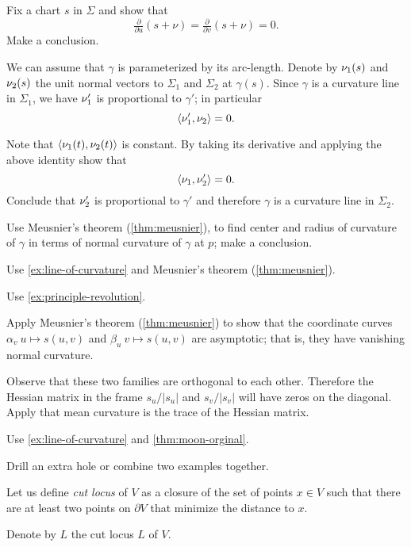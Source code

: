  Fix a chart $s$ in $\Sigma$ and show that 
\[\tfrac{\partial }{\partial u}(s+\nu)
=
\tfrac{\partial }{\partial v}(s+\nu)
=
0.\]
Make a conclusion.

We can assume that $\gamma$ is parameterized by its arc-length.
Denote by $\nu_1(s)$ and $\nu_2(s)$ the unit normal vectors to $\Sigma_1$ and $\Sigma_2$ at $\gamma(s)$.
Since $\gamma$ is a curvature line in $\Sigma_1$, we have 
$\nu_1'$ is proportional to $\gamma'$;
in particular 
\[\langle\nu_1',\nu_2\rangle=0.\]

Note that $\langle \nu_1(t),\nu_2(t)\rangle$ is constant.
By taking its derivative and applying the above identity show that
\[\langle\nu_1,\nu_2'\rangle=0.\]
Conclude that $\nu_2'$ is proportional to $\gamma'$
and therefore $\gamma$ is a curvature line in $\Sigma_2$.


 Use Meusnier's theorem (\ref{thm:meusnier}), to find center and radius of curvature of $\gamma$ in terms of normal curvature of $\gamma$ at $p$;
make a conclusion.

Use \ref{ex:line-of-curvature} and Meusnier's theorem (\ref{thm:meusnier}).

 Use \ref{ex:principle-revolution}.

 Apply Meusnier's theorem (\ref{thm:meusnier}) to show that the coordinate curves $\alpha_v\:u\mapsto s(u,v)$ and $\beta_u\:v\mapsto s(u,v)$ are asymptotic; that is, they have vanishing normal curvature.

Observe that these two families are orthogonal to each other.
Therefore the Hessian matrix in the frame $s_u/|s_u|$ and $s_v/|s_v|$ will have zeros on the diagonal.
Apply that mean curvature is the trace of the Hessian matrix.



 Use \ref{ex:line-of-curvature} and \ref{thm:moon-orginal}.

 Drill an extra hole or combine two examples together.

Let us define \emph{cut locus} of $V$ as a closure of the set of points $x\in V$ such that there are at least two points on $\partial V$ that minimize the distance to $x$.

Denote by $L$ the cut locus $L$ of $V$.

